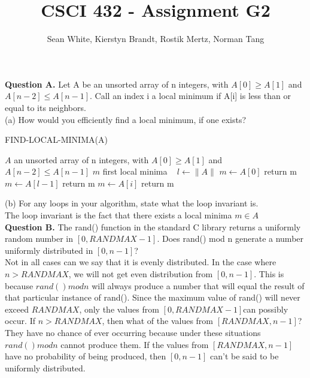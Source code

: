 \documentclass[12pt]{article}
\author{Sean White, Kierstyn Brandt, Rostik Mertz, Norman Tang}
\title{CSCI 432 - Assignment G2}
\begin{document}
\maketitle

\textbf{Question A.} Let A be an unsorted array of n integers, with $A[0] \geq A[1]$ and $A[n - 2] \leq A[n - 1]$. Call an index i a local minimum if A[i] is less than or equal to its neighbors.\\

(a) How would you efficiently find a local minimum, if one exists?\\

\begin{algorithm}[H]\caption{\textsc{FIND-LOCAL-MINIMA(A)}}
	\begin{algorithmic}[1]
		$A$ an unsorted array of n integers, with $A[0] \geq A[1]$ and $A[n - 2] \leq A[n - 1]$
		 $m$ first local minima
		\State ~
		\State $l \gets \|A\|$
			\State $m \gets A[0]$
			\State return m
		\EndIf
			\State $m \gets A[l - 1]$
			\State return m
		\EndIf
				\State $m \gets A[i]$
				\State return m
			\EndIf
		\EndFor
	\end{algorithmic}
\end{algorithm}

(b) For any loops in your algorithm, state what the loop invariant is.\\

The loop invariant is the fact that there exists a local minima $m \in A$\\

\textbf{Question B.} The rand() function in the standard C library returns a uniformly random number in $[0,RANDMAX-1]$. Does rand() mod n generate a number uniformly distributed in $[0, n-1]$?\\

Not in all cases can we say that it is evenly distributed. In the case where $n > RANDMAX$, we will not get even distribution from $[0, n-1]$. \newline
This is because $rand() mod n$ will always produce a number that will equal the result of that particular instance of rand(). \newline
Since the maximum value of rand() will never exceed $RANDMAX$, only the values from $[0, RANDMAX-1]$can possibly occur. \newline
If $n > RANDMAX$, then what of the values from $[RANDMAX, n-1]$? They have no chance of ever occurring because under these situations $rand() mod n$ cannot produce them. \newline
If the values from $[RANDMAX, n-1]$ have no probability of being produced, then $[0, n-1]$ can't be said to be uniformly distributed. \newline
\end{document}
